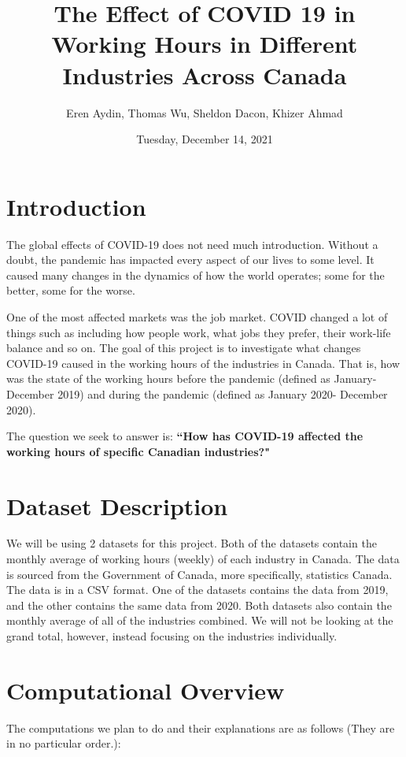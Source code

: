 \documentclass[fontsize=11pt]{article}
\title{  
The Effect of COVID 19 in Working Hours in Different Industries Across Canada}
\author{Eren Aydin, Thomas Wu, Sheldon Dacon, Khizer Ahmad}
\date{Tuesday, December 14, 2021}
\begin{document}
  
\maketitle  
  
\section*{Introduction}  
The global effects of COVID-19 does not need much introduction. Without a doubt, the pandemic has impacted every aspect of our lives to some level. It caused many changes in the dynamics of how the world operates; some for the better, some for the worse.   
  
One of the most affected markets was the job market. COVID changed a lot of things such as including how people work, what jobs they prefer, their work-life balance and so on. The goal of this project is to investigate what changes COVID-19 caused in the working hours of the industries in Canada. That is, how was the state of the working hours before the pandemic (defined as January-December 2019) and during the pandemic (defined as January 2020- December 2020).  
  
The question we seek to answer is:   
\textbf{``How has COVID-19 affected the working hours of specific Canadian industries?"}  
  
  
\section*{Dataset Description}  
We will be using 2 datasets for this project. Both of the datasets contain the monthly average of working hours (weekly) of each industry in Canada. The data is sourced from the Government of Canada, more specifically, statistics Canada. The data is in a CSV format. One of the datasets contains the data from 2019, and the other contains the same data from 2020. Both datasets also contain the monthly average of all of the industries combined. We will not be looking at the grand total, however, instead focusing on the industries individually.   
 
 

 
 
  
\section*{Computational Overview}  
The computations we plan to do and their explanations are as follows (They are in no particular order.):  
  
\end{document}
